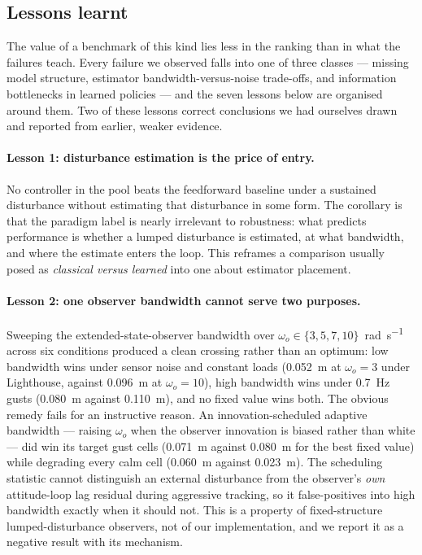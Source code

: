 \subsection{Lessons learnt}
\label{sec:results:lessons}

The value of a benchmark of this kind lies less in the ranking than in what the failures
teach. Every failure we observed falls into one of three classes --- missing model
structure, estimator bandwidth-versus-noise trade-offs, and information bottlenecks in
learned policies --- and the seven lessons below are organised around them. Two of these
lessons correct conclusions we had ourselves drawn and reported from earlier, weaker
evidence.

\paragraph{Lesson 1: disturbance estimation is the price of entry.}
No controller in the pool beats the feedforward baseline under a sustained disturbance
without estimating that disturbance in some form. The corollary is that the paradigm
label is nearly irrelevant to robustness: what predicts performance is whether a lumped
disturbance is estimated, at what bandwidth, and where the estimate enters the loop.
This reframes a comparison usually posed as \emph{classical versus learned} into one
about estimator placement.

\paragraph{Lesson 2: one observer bandwidth cannot serve two purposes.}
Sweeping the extended-state-observer bandwidth over
$\omega_o \in \{3,5,7,10\}$~\si{\radian\per\second} across six conditions produced a
clean crossing rather than an optimum: low bandwidth wins under sensor noise and
constant loads (\SI{0.052}{\meter} at $\omega_o=3$ under Lighthouse, against
\SI{0.096}{\meter} at $\omega_o=10$), high bandwidth wins under \SI{0.7}{\hertz} gusts
(\SI{0.080}{\meter} against \SI{0.110}{\meter}), and no fixed value wins both. The
obvious remedy fails for an instructive reason. An innovation-scheduled adaptive
bandwidth --- raising $\omega_o$ when the observer innovation is biased rather than
white --- did win its target gust cells (\SI{0.071}{\meter} against \SI{0.080}{\meter}
for the best fixed value) while degrading every calm cell (\SI{0.060}{\meter} against
\SI{0.023}{\meter}). The scheduling statistic cannot distinguish an external disturbance
from the observer's \emph{own} attitude-loop lag residual during aggressive tracking, so
it false-positives into high bandwidth exactly when it should not. This is a property of
fixed-structure lumped-disturbance observers, not of our implementation, and we report
it as a negative result with its mechanism.

